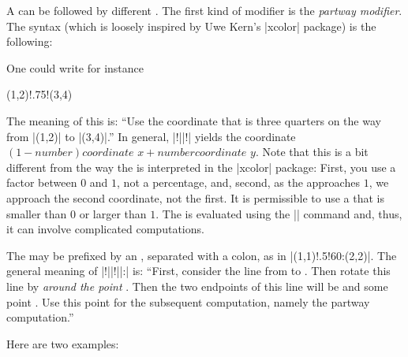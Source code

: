 A  can be followed by different . The first
kind of modifier is the \emph{partway modifier}. The syntax (which is loosely
inspired by Uwe Kern's |xcolor| package) is the following:
%
\begin{quote}
\end{quote}
%
One could write for instance
%
\begin{codeexample}
(1,2)!.75!(3,4)
\end{codeexample}
%
The meaning of this is: ``Use the coordinate that is three quarters on the way
from |(1,2)| to |(3,4)|.'' In general, |!||!| yields the coordinate $(1 -
\textit{number})\textit{coordinate x} + \textit{number} \textit{coordinate y}$. Note
that this is a bit different from the way the  is interpreted in
the |xcolor| package: First, you use a factor between $0$ and $1$, not a
percentage, and, second, as the  approaches $1$, we approach the
second coordinate, not the first. It is permissible to use a  that
is smaller than $0$ or larger than $1$. The  is evaluated using
the |\pgfmathparse| command and, thus, it can involve complicated computations.
%
\begin{codeexample}[preamble={\usetikzlibrary{calc}}]
\end{codeexample}

The  may be prefixed by an , separated with
a colon, as in |(1,1)!.5!60:(2,2)|. The general meaning of
|!||!||:| is: ``First, consider the
line from  to . Then rotate this line by 
\emph{around the point }. Then the two endpoints of this line will be
 and some point . Use this point  for the subsequent
computation, namely the partway computation.''

Here are two examples:
%
\begin{codeexample}[preamble={\usetikzlibrary{calc}}]
\end{codeexample}

